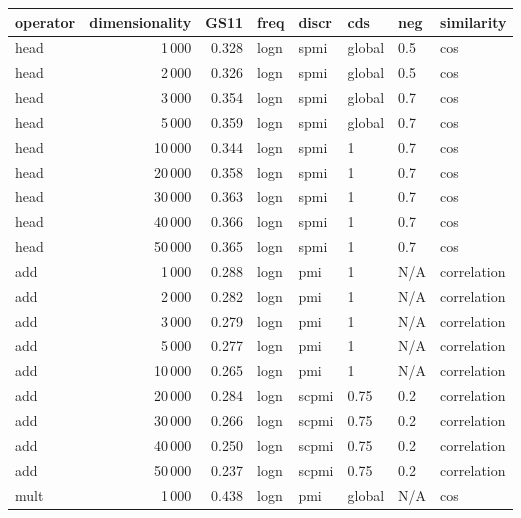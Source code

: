 \begin{tabular}{lrrlllll}
\toprule
operator &  dimensionality &   GS11 &  freq &  discr &     cds &  neg &     similarity \\
\midrule
    head &            1\,000 &  0.328 &  logn &   spmi &  global &  0.5 &            cos \\
    head &            2\,000 &  0.326 &  logn &   spmi &  global &  0.5 &            cos \\
    head &            3\,000 &  0.354 &  logn &   spmi &  global &  0.7 &            cos \\
    head &            5\,000 &  0.359 &  logn &   spmi &  global &  0.7 &            cos \\
    head &           10\,000 &  0.344 &  logn &   spmi &       1 &  0.7 &            cos \\
    head &           20\,000 &  0.358 &  logn &   spmi &       1 &  0.7 &            cos \\
    head &           30\,000 &  0.363 &  logn &   spmi &       1 &  0.7 &            cos \\
    head &           40\,000 &  0.366 &  logn &   spmi &       1 &  0.7 &            cos \\
    head &           50\,000 &  0.365 &  logn &   spmi &       1 &  0.7 &            cos \\
     add &            1\,000 &  0.288 &  logn &    pmi &       1 &  N/A &    correlation \\
     add &            2\,000 &  0.282 &  logn &    pmi &       1 &  N/A &    correlation \\
     add &            3\,000 &  0.279 &  logn &    pmi &       1 &  N/A &    correlation \\
     add &            5\,000 &  0.277 &  logn &    pmi &       1 &  N/A &    correlation \\
     add &           10\,000 &  0.265 &  logn &    pmi &       1 &  N/A &    correlation \\
     add &           20\,000 &  0.284 &  logn &  scpmi &    0.75 &  0.2 &    correlation \\
     add &           30\,000 &  0.266 &  logn &  scpmi &    0.75 &  0.2 &    correlation \\
     add &           40\,000 &  0.250 &  logn &  scpmi &    0.75 &  0.2 &    correlation \\
     add &           50\,000 &  0.237 &  logn &  scpmi &    0.75 &  0.2 &    correlation \\
    mult &            1\,000 &  0.438 &  logn &    pmi &  global &  N/A &            cos \\

\end{tabular}
